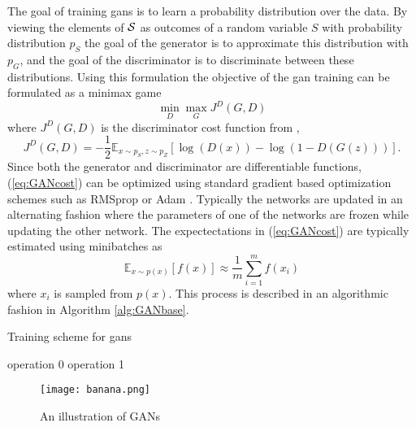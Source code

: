 The goal of training \acrshort{gans} is to learn a probability distribution over the data. By viewing the elements of $\mathcal{S}$ as outcomes of a random variable $S$ with probability distribution $p_S$ the goal of the generator is to approximate this distribution with $p_G$, and the goal of the discriminator is to discriminate between these distributions. Using this formulation the objective of the \acrshort{gan} training can be formulated as a minimax game 
\begin{equation}
    \min_D \max_G J^{D}(G, D)
\end{equation}
where $J^D(G, D)$ is the discriminator cost function from \parencite{goodfellow2016nips},
\begin{equation}
    J^D(G, D) = -\frac{1}{2}\mathbb{E}_{x \sim p_S, z \sim p_Z}\left[\log(D(x)) - \log(1 - D(G(z))) \right].
    \label{eq:GANcost}
\end{equation}
Since both the generator and discriminator are differentiable functions, (\ref{eq:GANcost}) can be optimized using standard gradient based optimization schemes such as RMSprop \parencite{tieleman2012lecture} or Adam \parencite{kingma2014adam}. Typically the networks are updated in an alternating fashion where the parameters of one of the networks are frozen while updating the other network. The expectectations in (\ref{eq:GANcost}) are typically estimated using minibatches as 
\begin{equation}
    \mathbb{E}_{x\sim p(x)}[f(x)] \approx \frac{1}{m}\sum_{i=1}^mf(x_i)
\end{equation}
where $x_i$ is sampled from $p(x)$. This process is described in an algorithmic fashion in Algorithm \ref{alg:GANbase}.

\begin{algorithm}
    \caption{Training scheme for \acrlong{gans}}
  \label{alg:GANbase}
  \begin{algorithmic}[1]
    \STATE operation 0 \label{op0}
    \STATE operation 1 \label{op1}
  \end{algorithmic}
\end{algorithm}

\begin{figure}
    \caption{An illustration of GANs}
    \label{fig:GAN}
    \centering
    \texttt{[image: banana.png]}
\end{figure}

